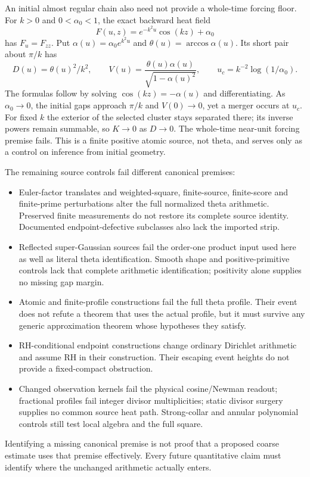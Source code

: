 An initial almost regular chain also need not provide a whole-time
forcing floor. For $k>0$ and $0<\alpha_0<1$, the exact backward heat
field
\begin{equation}
 F(u,z)=e^{-k^2u}\cos(kz)+\alpha_0
 \label{prog:cosine-control}
\end{equation}
has $F_u=F_{zz}$. Put $\alpha(u)=\alpha_0e^{k^2u}$ and
$\theta(u)=\arccos\alpha(u)$. Its short pair about $\pi/k$ has
\[
 D(u)=\theta(u)^2/k^2,\qquad
 V(u)=\frac{\theta(u)\alpha(u)}{\sqrt{1-\alpha(u)^2}},\qquad
 u_c=k^{-2}\log(1/\alpha_0).
\]
The formulas follow by solving $\cos(kz)=-\alpha(u)$ and differentiating.
As $\alpha_0\to0$, the initial gaps approach $\pi/k$ and
$V(0)\to0$, yet a merger occurs at $u_c$. For fixed $k$ the exterior
of the selected cluster stays separated there; its inverse powers
remain summable, so $K\to0$ as $D\to0$. The whole-time near-unit
forcing premise fails. This is a finite positive atomic source, not
theta, and serves only as a control on inference from initial geometry.

The remaining source controls fail different canonical premises:
\begin{itemize}
\item Euler-factor translates and weighted-square, finite-source,
finite-score and finite-prime perturbations alter the full normalized
theta arithmetic. Preserved finite measurements do not restore its
complete source identity. Documented endpoint-defective subclasses also
lack the imported strip.
\item Reflected super-Gaussian sources fail the order-one product input
used here as well as literal theta identification. Smooth shape and
positive-primitive controls lack that complete arithmetic identification;
positivity alone supplies no missing gap margin.
\item Atomic and finite-profile constructions fail the full theta profile.
Their event does not refute a theorem that uses the actual profile, but
it must survive any generic approximation theorem whose hypotheses they
satisfy.
\item RH-conditional endpoint constructions change ordinary Dirichlet
arithmetic and assume RH in their construction. Their escaping event
heights do not provide a fixed-compact obstruction.
\item Changed observation kernels fail the physical cosine/Newman
readout; fractional profiles fail integer divisor multiplicities; static
divisor surgery supplies no common source heat path. Strong-collar and
annular polynomial controls still test local algebra and the full square.
\end{itemize}
Identifying a missing canonical premise is not proof that a proposed
coarse estimate uses that premise effectively. Every future quantitative
claim must identify where the unchanged arithmetic actually enters.

